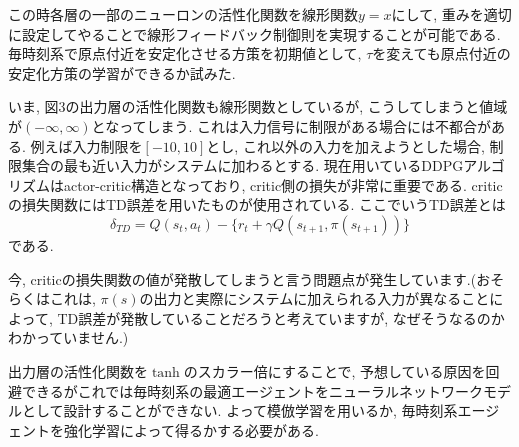 \documentclass{jsarticle}
\begin{document}
この時各層の一部のニューロンの活性化関数を線形関数$y=x$にして, 重みを適切に設定してやることで線形フィードバック制御則を実現することが可能である. 毎時刻系で原点付近を安定化させる方策を初期値として,  $\tau$を変えても原点付近の安定化方策の学習ができるか試みた.\par
いま, 図3の出力層の活性化関数も線形関数としているが, こうしてしまうと値域が$(-\infty, \infty)$となってしまう. これは入力信号に制限がある場合には不都合がある.
例えば入力制限を$[-10, 10]$とし, これ以外の入力を加えようとした場合, 制限集合の最も近い入力がシステムに加わるとする. 現在用いているDDPGアルゴリズムはactor-critic構造となっており, critic側の損失が非常に重要である. criticの損失関数にはTD誤差を用いたものが使用されている. ここでいうTD誤差とは
\begin{equation}
	\delta_{TD} = Q(s_t, a_t) - \{r_t + \gamma Q(s_{t+1}, \pi(s_{t+1}))\}
\end{equation}
である.\par

今, criticの損失関数の値が発散してしまうと言う問題点が発生しています.(おそらくはこれは, $\pi(s)$の出力と実際にシステムに加えられる入力が異なることによって, TD誤差が発散していることだろうと考えていますが, なぜそうなるのかわかっていません.)\par

出力層の活性化関数を$\tanh$のスカラー倍にすることで, 予想している原因を回避できるがこれでは毎時刻系の最適エージェントをニューラルネットワークモデルとして設計することができない. よって模倣学習を用いるか, 毎時刻系エージェントを強化学習によって得るかする必要がある.


 
\end{document}
